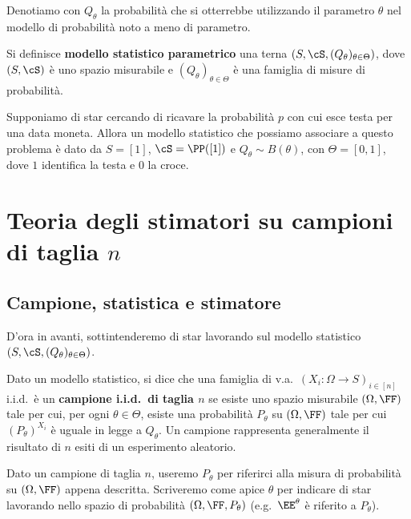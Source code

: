 \begin{multicols*}{2}
\begin{notation}
    Denotiamo con $Q_\theta$ la probabilità che si otterrebbe utilizzando il parametro $\theta$
    nel modello di probabilità noto a meno di parametro.
\end{notation}

\begin{definition}
    Si definisce \textbf{modello statistico parametrico} una terna $(S, \cS, (Q_\theta)_{\theta \in \Theta})$,
    dove $(S, \cS)$ è uno spazio misurabile e $(Q_\theta)_{\theta \in \Theta}$ è una famiglia di
    misure di probabilità.
\end{definition}

\begin{example}
    Supponiamo di star cercando di ricavare la probabilità $p$ con cui esce testa per una data moneta. Allora
    un modello statistico che possiamo associare a questo problema è dato da $S = [1]$, $\cS = \PP([1])$ e
    $Q_\theta \sim B(\theta)$, con $\Theta = [0, 1]$, dove $1$ identifica la testa e $0$ la croce.
\end{example}

\section{Teoria degli stimatori su campioni di taglia \texorpdfstring{$n$}{n}}

\subsection{Campione, statistica e stimatore}

D'ora in avanti, sottintenderemo di star lavorando sul modello
statistico $(S, \cS, (Q_\theta)_{\theta \in \Theta})$.

\begin{definition}
    Dato un modello statistico, si dice
    che una famiglia di v.a.~$(X_i : \Omega \to S)_{i \in [n]}$ i.i.d.~è un \textbf{campione i.i.d.~di taglia $n$}
    se esiste uno spazio misurabile $(\Omega, \FF)$ tale per cui,
    per ogni $\theta \in \Theta$, esiste una probabilità $P_\theta$ su $(\Omega, \FF)$ tale per cui
    $(P_\theta)^{X_i}$ è uguale in legge a $Q_\theta$. Un campione rappresenta generalmente il risultato di
    $n$ esiti di un esperimento aleatorio.
\end{definition}

Dato un campione di taglia $n$, useremo $P_\theta$ per riferirci alla misura di probabilità
su $(\Omega, \FF)$ appena descritta. Scriveremo
come apice $\theta$ per indicare di star lavorando nello spazio
di probabilità $(\Omega, \FF, P_\theta)$ (e.g.~$\EE^\theta$ è riferito
a $P_\theta$).


\end{multicols*}
